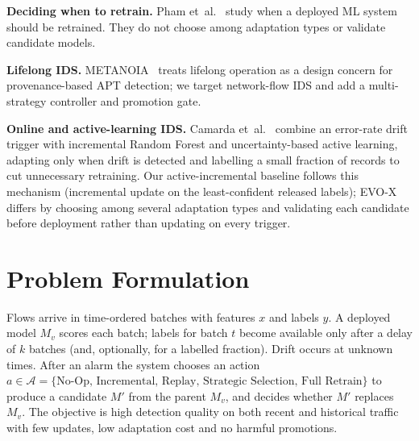 \documentclass[conference]{IEEEtran}
\newcommand{\evox}{\textsc{EVO-X}}
\begin{document}
\textbf{Deciding when to retrain.} Pham et~al.~\cite{pham2025retrain} study when a deployed ML system should be retrained. They do not choose among adaptation types or validate candidate models.

\textbf{Lifelong IDS.} METANOIA~\cite{ying2025metanoia} treats lifelong operation as a design concern for provenance-based APT detection; we target network-flow IDS and add a multi-strategy controller and promotion gate.

\textbf{Online and active-learning IDS.} Camarda et~al.~\cite{camarda2025activedrift} combine an error-rate drift trigger with incremental Random Forest and uncertainty-based active learning, adapting only when drift is detected and labelling a small fraction of records to cut unnecessary retraining. Our active-incremental baseline follows this mechanism (incremental update on the least-confident released labels); \evox{} differs by choosing among several adaptation types and validating each candidate before deployment rather than updating on every trigger.

\section{Problem Formulation}
\label{sec:problem}
Flows arrive in time-ordered batches with features $x$ and labels $y$. A deployed model $M_v$ scores each batch; labels for batch $t$ become available only after a delay of $k$ batches (and, optionally, for a labelled fraction). Drift occurs at unknown times. After an alarm the system chooses an action $a\in\mathcal{A}=\{\text{No-Op, Incremental, Replay, Strategic Selection, Full Retrain}\}$ to produce a candidate $M'$ from the parent $M_v$, and decides whether $M'$ replaces $M_v$. The objective is high detection quality on both recent and historical traffic with few updates, low adaptation cost and no harmful promotions.

\end{document}
